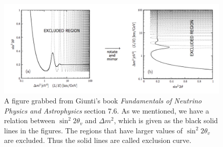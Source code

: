 \documentclass[letterpaper,12pt,english]{sphinxmanual}
\begin{document}
\begin{figure}[htbp]
\centering
\capstart

\includegraphics{sinSquare2thetaVSDeltamSquare.png}
\caption{A figure grabbed from Giunti's book \emph{Fundamentals of Neutrino Physics and Astrophysics} section 7.6. As we mentioned, we have a relation between \(\sin^2 2\theta_v\) and \(\Delta m^2\), which is given as the black solid lines in the figures. The regions that have larger values of \(\sin ^2 2\theta_v\) are excluded. Thus the solid lines are called exclusion curve.}\label{experiments:index-1}\end{figure}
\end{document}
